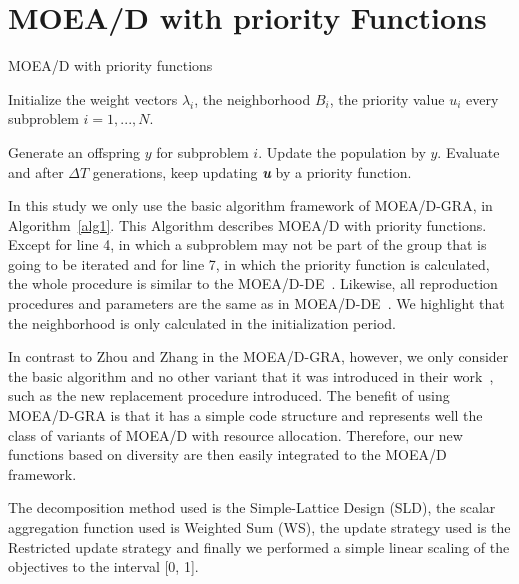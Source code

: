 \section{MOEA/D with priority Functions}



\begin{algorithm}[h]
	\caption{MOEA/D with priority functions}\label{alg1}
	\begin{algorithmic}[1]
		
		\State Initialize the weight vectors $\lambda_i$, the neighborhood $B_i$, the priority value $u_i$ every subproblem $i=1,...,N$.
		
		\State Generate an offspring $y$ for subproblem $i$.
		\State Update the population by $y$.
		\EndIf
		\EndFor
		\State  Evaluate and after $\Delta T$ generations, keep updating \textit{\textbf{u}} by a priority function.
		\EndWhile
	\end{algorithmic}
\end{algorithm}

In this study we only use the basic algorithm framework of MOEA/D-GRA, in Algorithm~\ref{alg1}. This Algorithm describes MOEA/D with priority functions. Except for line 4, in which a subproblem may not be part of the group that is going to be iterated and for line 7, in which the priority function is calculated, the whole procedure is similar to the MOEA/D-DE~\cite{zhang2009performance}. Likewise, all reproduction procedures and parameters are the same as in MOEA/D-DE~\cite{li2009multiobjective}. We highlight that the neighborhood is only calculated in the initialization period.

In contrast to Zhou and Zhang in the MOEA/D-GRA, however, we only consider the basic algorithm and no other variant that it was introduced in their work~\cite{zhou2016all}, such as the new replacement procedure introduced. The benefit of using MOEA/D-GRA is that it has a simple code structure and represents well the class of variants of MOEA/D with resource allocation. Therefore, our new functions based on diversity are then easily integrated to the MOEA/D framework.

The decomposition method used is the Simple-Lattice Design (SLD), the scalar aggregation function used is Weighted Sum (WS), the update strategy used is the Restricted update strategy and finally we performed a simple linear scaling of the objectives to the interval [0, 1].



